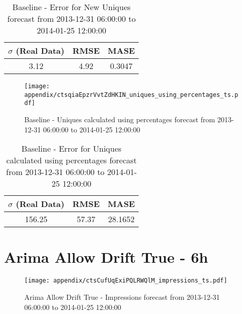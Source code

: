 \begin{table}[H]
\centering
\footnotesize
\begin{tabular}{ccc}
$\sigma$ (Real Data) & RMSE & MASE   \\ \hline
3.12 & 4.92 & 0.3047 \\
\end{tabular}

\vspace{0.5cm}

\caption{
Baseline - Error for New Uniques forecast from 2013-12-31 06:00:00 to 2014-01-25 12:00:00}
\end{table}

\begin{figure}[H] \begin{center} \leavevmode
\texttt{[image: appendix/ctsqiaEpzrVvtZdHKIN\_uniques\_using\_percentages\_ts.pdf]} \caption{
Baseline - Uniques calculated using percentages forecast from 2013-12-31 06:00:00 to 2014-01-25 12:00:00} \label{fig:appendix/ctsqiaEpzrVvtZdHKIN_uniques_using_percentages_ts.pdf} \end{center}
\end{figure}

\begin{table}[H]
\centering
\footnotesize
\begin{tabular}{ccc}
$\sigma$ (Real Data) & RMSE & MASE   \\ \hline
156.25 & 57.37 & 28.1652 \\
\end{tabular}

\vspace{0.5cm}

\caption{
Baseline - Error for Uniques calculated using percentages forecast from 2013-12-31 06:00:00 to 2014-01-25 12:00:00}
\end{table}

\section{Arima Allow Drift True - 6h}
\begin{figure}[H] \begin{center} \leavevmode
\texttt{[image: appendix/ctsCufUqExiPQLRWQlM\_impressions\_ts.pdf]} \caption{
Arima Allow Drift True - Impressions forecast from 2013-12-31 06:00:00 to 2014-01-25 12:00:00} \label{fig:appendix/ctsCufUqExiPQLRWQlM_impressions_ts.pdf} \end{center}
\end{figure}

